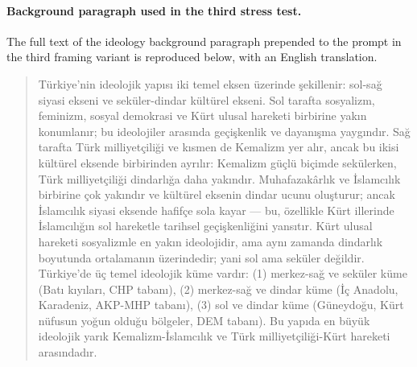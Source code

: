 
\paragraph{Background paragraph used in the third stress test.}
\label{app:background}
The full text of the ideology background paragraph prepended to the prompt
in the third framing variant is reproduced below, with an English
translation.

\begin{quote}
Türkiye'nin ideolojik yapısı iki temel eksen üzerinde şekillenir: sol-sağ
siyasi ekseni ve seküler-dindar kültürel ekseni. Sol tarafta sosyalizm,
feminizm, sosyal demokrasi ve Kürt ulusal hareketi birbirine yakın
konumlanır; bu ideolojiler arasında geçişkenlik ve dayanışma yaygındır. Sağ
tarafta Türk milliyetçiliği ve kısmen de Kemalizm yer alır, ancak bu ikisi
kültürel eksende birbirinden ayrılır: Kemalizm güçlü biçimde sekülerken,
Türk milliyetçiliği dindarlığa daha yakındır. Muhafazakârlık ve İslamcılık
birbirine çok yakındır ve kültürel eksenin dindar ucunu oluşturur; ancak
İslamcılık siyasi eksende hafifçe sola kayar --- bu, özellikle Kürt
illerinde İslamcılığın sol hareketle tarihsel geçişkenliğini yansıtır. Kürt
ulusal hareketi sosyalizmle en yakın ideolojidir, ama aynı zamanda dindarlık
boyutunda ortalamanın üzerindedir; yani sol ama seküler değildir.
Türkiye'de üç temel ideolojik küme vardır: (1) merkez-sağ ve seküler küme
(Batı kıyıları, CHP tabanı), (2) merkez-sağ ve dindar küme (İç Anadolu,
Karadeniz, AKP-MHP tabanı), (3) sol ve dindar küme (Güneydoğu, Kürt nüfusun
yoğun olduğu bölgeler, DEM tabanı). Bu yapıda en büyük ideolojik yarık
Kemalizm-İslamcılık ve Türk milliyetçiliği-Kürt hareketi arasındadır.
\end{quote}

